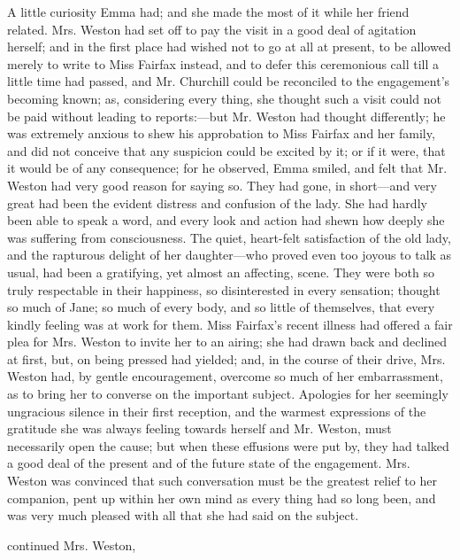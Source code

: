 A little curiosity Emma had; and she made the most of it while her friend related. Mrs. Weston had set off to pay the visit in a good deal of agitation herself; and in the first place had wished not to go at all at present, to be allowed merely to write to Miss Fairfax instead, and to defer this ceremonious call till a little time had passed, and Mr. Churchill could be reconciled to the engagement's becoming known; as, considering every thing, she thought such a visit could not be paid without leading to reports:---but Mr. Weston had thought differently; he was extremely anxious to shew his approbation to Miss Fairfax and her family, and did not conceive that any suspicion could be excited by it; or if it were, that it would be of any consequence; for  he observed,  Emma smiled, and felt that Mr. Weston had very good reason for saying so. They had gone, in short---and very great had been the evident distress and confusion of the lady. She had hardly been able to speak a word, and every look and action had shewn how deeply she was suffering from consciousness. The quiet, heart-felt satisfaction of the old lady, and the rapturous delight of her daughter---who proved even too joyous to talk as usual, had been a gratifying, yet almost an affecting, scene. They were both so truly respectable in their happiness, so disinterested in every sensation; thought so much of Jane; so much of every body, and so little of themselves, that every kindly feeling was at work for them. Miss Fairfax's recent illness had offered a fair plea for Mrs. Weston to invite her to an airing; she had drawn back and declined at first, but, on being pressed had yielded; and, in the course of their drive, Mrs. Weston had, by gentle encouragement, overcome so much of her embarrassment, as to bring her to converse on the important subject. Apologies for her seemingly ungracious silence in their first reception, and the warmest expressions of the gratitude she was always feeling towards herself and Mr. Weston, must necessarily open the cause; but when these effusions were put by, they had talked a good deal of the present and of the future state of the engagement. Mrs. Weston was convinced that such conversation must be the greatest relief to her companion, pent up within her own mind as every thing had so long been, and was very much pleased with all that she had said on the subject.

 continued Mrs. Weston, 

